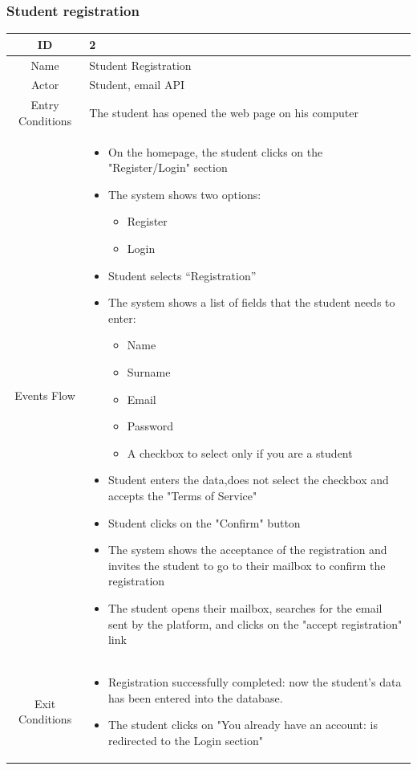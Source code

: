 \subsubsection{Student registration}
\begin{longtable}{|c| p{10cm}|}
\hline
ID & 2 \\
\hline
Name & Student Registration \\
\hline
Actor & Student, email API \\
\hline
Entry Conditions &
The student has opened the web page on his computer\\
\hline
Events Flow & \begin{itemize}
\item On the homepage, the student clicks on the "Register/Login" section
\item The system shows two options:
\begin{itemize}
\item Register
\item Login
\end{itemize}
\item Student selects “Registration”
\item The system shows a list of fields that the student needs to enter:
\begin{itemize}
\item Name
\item Surname
\item Email
\item Password
\item A checkbox to select only if you are a student
\end{itemize}
\item Student enters the data,does not select the checkbox and accepts the "Terms of Service"
\item Student clicks on the "Confirm" button
\item The system shows the acceptance of the registration and invites the student to go to their mailbox to confirm the registration
\item The student opens their mailbox, searches for the email sent by the platform, and clicks on the "accept registration" link
\end{itemize} \\
\hline
Exit Conditions &
\begin{itemize}
\item Registration successfully completed: now the student's data has been entered into the database.
\item The student clicks on "You already have an account: is redirected to the Login section"

\end{itemize}
\end{longtable}
